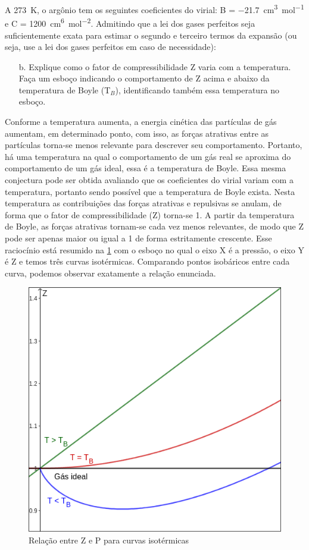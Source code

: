 \begin{xcs}
    A \qty{273}{K}, o argônio tem os seguintes coeficientes do virial: 
    B = \qty{-21,7}{cm^3 mol^{-1}} e C = \qty{1200}{cm^6 mol^{-2}}.
    Admitindo que a lei dos gases perfeitos seja
    suficientemente exata para estimar o segundo e terceiro termos da expansão
    (ou seja, use a lei dos gases perfeitos em caso de necessidade): 
    \begin{enumerate}[label=\alph*.]
        \item[b.] Explique como o fator de compressibilidade Z varia com a
            temperatura. Faça um esboço indicando o comportamento de Z acima e
            abaixo da temperatura de Boyle (T\(_B\)), identificando também essa
            temperatura no esboço. 
    \end{enumerate}
\end{xcs}
\begin{rsl}
    Conforme a temperatura aumenta, a  energia cinética das partículas de gás
    aumentam, em determinado ponto, com isso, as forças atrativas entre as
    partículas torna-se menos relevante para descrever seu comportamento.
    Portanto, há uma temperatura na qual o comportamento de um gás real se
    aproxima do comportamento de um gás ideal, essa é a temperatura de Boyle.
    Essa mesma conjectura pode ser obtida avaliando que os coeficientes do
    virial variam com a temperatura, portanto sendo possível que a temperatura
    de Boyle exista. Nesta temperatura as contribuições das forças atrativas e
    repulsivas se anulam, de forma que o fator de compressibilidade (Z) torna-se
    1. A partir da temperatura de Boyle, as forças atrativas tornam-se cada vez
    menos relevantes, de modo que Z pode ser apenas maior ou igual a 1 de forma
    estritamente crescente. Esse raciocínio está resumido na
    \cref{geo3b.png} com o esboço no qual o eixo X é a pressão, o eixo Y é Z e
    temos três curvas isotérmicas. Comparando pontos isobáricos entre cada
    curva, podemos observar exatamente a relação enunciada. 
    \begin{figure}[H]
        \centering
        \includegraphics[width=.4\linewidth]{images/geo3b.png}
        \caption{Relação entre Z e P para curvas isotérmicas}
        \label{geo3b.png}
    \end{figure}
\end{rsl}
